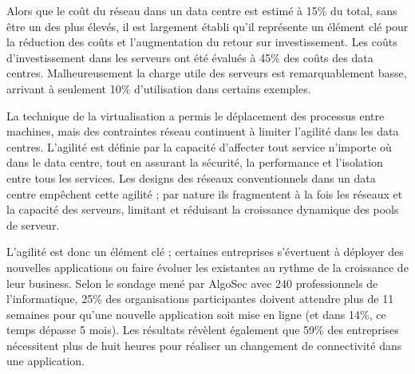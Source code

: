 \par
Alors que le coût du réseau dans un data centre est estimé à 15\% \cite{cloudCosts} du total, sans être un des plus élevés, il est largement établi qu'il représente un élément clé pour la réduction des coûts et l'augmentation du retour sur investissement. Les coûts d'investissement dans les serveurs ont été évalués à 45\% des coûts des data centres. Malheureusement la charge utile des serveurs est remarquablement basse, arrivant à seulement 10\% d'utilisation dans certains exemples.

\par 
La technique de la virtualisation a permis le déplacement des processus entre machines, mais des contraintes réseau continuent à limiter l'agilité dans les data centres. L'agilité est définie par la capacité d'affecter tout service n'importe où dans le data centre, tout en assurant la sécurité, la performance et l'isolation entre tous les services. Les designs des réseaux conventionnels dans un data centre empêchent cette agilité ; par nature ils fragmentent  à la fois les réseaux et la capacité des serveurs, limitant et réduisant la croissance dynamique des pools de serveur. \cite{cloudCostsAgility}



\par 
L'agilité est donc un élément clé ; certaines entreprises s'évertuent à déployer des nouvelles applications ou faire évoluer les existantes au rythme de la croissance de leur business. Selon le sondage mené par AlgoSec avec 240 professionnels de l'informatique, 25\% des organisations participantes doivent attendre plus de 11 semaines pour qu'une nouvelle application soit mise en ligne (et dans 14\%, ce temps dépasse 5 mois). Les résultats révèlent également que 59\% des entreprises nécessitent plus de huit heures pour réaliser un changement de connectivité dans une application. \cite{algoSecSurvey}


